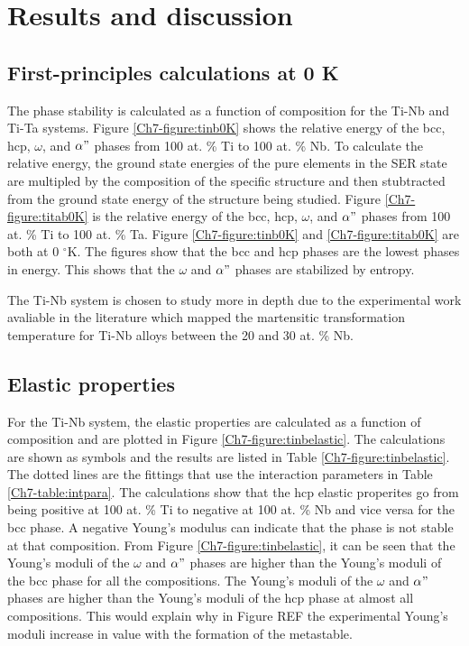 \section{Results and discussion}

\subsection{First-principles calculations at 0 K}

The phase stability is calculated as a function of composition for the Ti-Nb and Ti-Ta systems. Figure \ref{Ch7-figure:tinb0K} shows the relative energy of the bcc, hcp, $\omega$, and $\alpha"$ phases from 100 at. \% Ti to 100 at. \% Nb. To calculate the relative energy, the ground state energies of the pure elements in the SER state are multipled by the composition of the specific structure and then stubtracted from the ground state energy of the structure being studied. Figure \ref{Ch7-figure:titab0K} is the relative energy of the bcc, hcp, $\omega$, and $\alpha"$ phases from 100 at. \% Ti to 100 at. \% Ta. Figure \ref{Ch7-figure:tinb0K} and \ref{Ch7-figure:titab0K} are both at 0 $^\circ$K. The figures show that the bcc and hcp phases are the lowest phases in energy. This shows that the $\omega$ and $\alpha"$ phases are stabilized by entropy.

The Ti-Nb system is chosen to study more in depth due to the experimental work avaliable in the literature which mapped the martensitic transformation temperature for Ti-Nb alloys between the 20 and 30 at. \% Nb.

\subsection{Elastic properties}

For the Ti-Nb system, the elastic properties are calculated as a function of composition and are plotted in Figure \ref{Ch7-figure:tinbelastic}. The calculations are shown as symbols and the results are listed in Table \ref{Ch7-figure:tinbelastic}. The dotted lines are the fittings that use the interaction parameters in Table \ref{Ch7-table:intpara}. The calculations show that the hcp elastic properites go from being positive at 100 at. \% Ti to negative at 100 at. \% Nb and vice versa for the bcc phase. A negative Young's modulus can indicate that the phase is not stable at that composition. From Figure \ref{Ch7-figure:tinbelastic}, it can be seen that the Young's moduli of the $\omega$ and $\alpha"$ phases are higher than the Young's moduli of the bcc phase for all the compositions. The Young's moduli of the $\omega$ and $\alpha"$ phases are higher than the Young's moduli of the hcp phase at almost all compositions. This would explain why in Figure REF the experimental Young's moduli increase in value with the formation of the metastable. 

